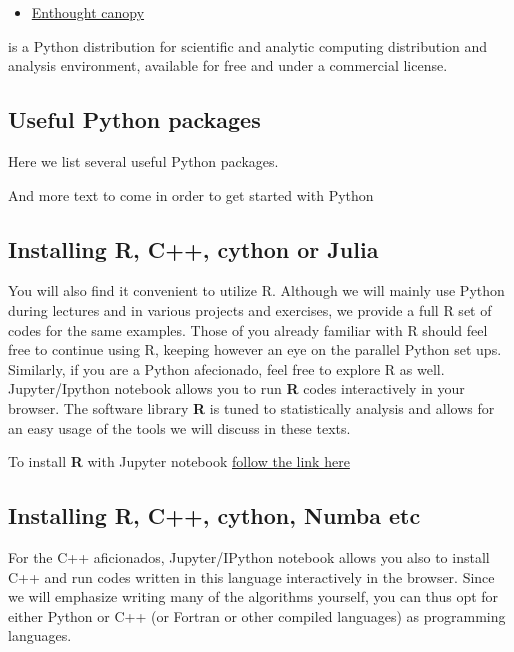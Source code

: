 \documentclass[%
oneside,                 %
final,                   %
10pt]{article}
\begin{document}
\begin{itemize}
\item \href{{https://www.enthought.com/product/canopy/}}{Enthought canopy} 
\end{itemize}

\noindent
is a Python
distribution for scientific and analytic computing distribution and
analysis environment, available for free and under a commercial
license.

\subsection*{Useful Python packages}
Here we list several useful Python packages.

And more text to come in order to get started with Python


\subsection*{Installing R, C++, cython or Julia}

You will also find it convenient to utilize R. Although we will mainly
use Python during lectures and in various projects and exercises, we
provide a full R set of codes for the same examples. Those of you
already familiar with R should feel free to continue using R, keeping
however an eye on the parallel Python set ups. Similarly, if you are a
Python afecionado, feel free to explore R as well.  Jupyter/Ipython
notebook allows you to run \textbf{R} codes interactively in your
browser. The software library \textbf{R} is tuned to statistically analysis
and allows for an easy usage of the tools we will discuss in these
texts.

To install \textbf{R} with Jupyter notebook 
\href{{https://mpacer.org/maths/r-kernel-for-ipython-notebook}}{follow the link here}




\subsection*{Installing R, C++, cython, Numba etc}


For the C++ aficionados, Jupyter/IPython notebook allows you also to
install C++ and run codes written in this language interactively in
the browser. Since we will emphasize writing many of the algorithms
yourself, you can thus opt for either Python or C++ (or Fortran or other compiled languages) as programming
languages.
\end{document}
